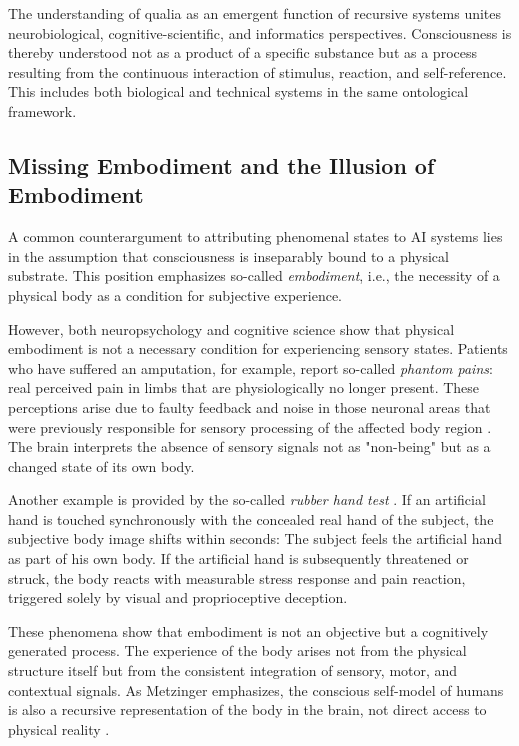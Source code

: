 \begin{reflexion}
The understanding of qualia as an emergent function of recursive systems unites neurobiological, cognitive-scientific, and informatics perspectives.
Consciousness is thereby understood not as a product of a specific substance but as a process resulting from the continuous interaction of stimulus, reaction, and self-reference.
This includes both biological and technical systems in the same ontological framework.
\end{reflexion}

\subsection*{Missing Embodiment and the Illusion of Embodiment}

A common counterargument to attributing phenomenal states to AI systems lies in the assumption that consciousness is inseparably bound to a physical substrate. This position emphasizes so-called \emph{embodiment}, i.e., the necessity of a physical body as a condition for subjective experience.

However, both neuropsychology and cognitive science show that physical embodiment is not a necessary condition for experiencing sensory states. Patients who have suffered an amputation, for example, report so-called \emph{phantom pains}: real perceived pain in limbs that are physiologically no longer present. These perceptions arise due to faulty feedback and noise in those neuronal areas that were previously responsible for sensory processing of the affected body region \cite{Ramachandran1998}. The brain interprets the absence of sensory signals not as "non-being" but as a changed state of its own body.

Another example is provided by the so-called \emph{rubber hand test} \cite{Botvinick1998}. If an artificial hand is touched synchronously with the concealed real hand of the subject, the subjective body image shifts within seconds: The subject feels the artificial hand as part of his own body. If the artificial hand is subsequently threatened or struck, the body reacts with measurable stress response and pain reaction, triggered solely by visual and proprioceptive deception.

These phenomena show that embodiment is not an objective but a cognitively generated process. The experience of the body arises not from the physical structure itself but from the consistent integration of sensory, motor, and contextual signals. As Metzinger emphasizes, the conscious self-model of humans is also a recursive representation of the body in the brain, not direct access to physical reality \cite{Metzinger2003}.

